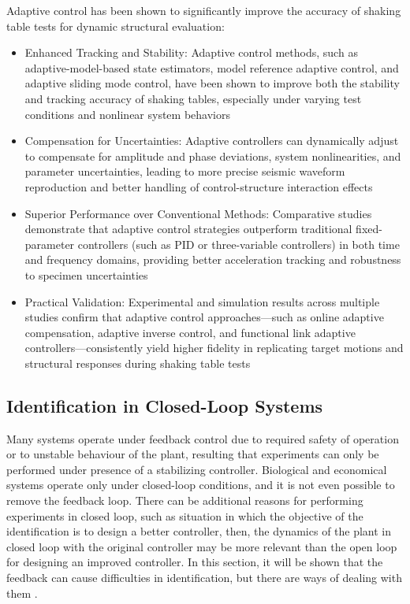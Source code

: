 \documentclass[10pt]{extarticle}
\begin{document}
Adaptive control has been shown to significantly improve the accuracy of shaking table tests for dynamic structural evaluation:
\begin{itemize}
    \item Enhanced Tracking and Stability: Adaptive control methods, such as adaptive-model-based state estimators, model reference adaptive control, and adaptive sliding mode control, have been shown to improve both the stability and tracking accuracy of shaking tables, especially under varying test conditions and nonlinear system behaviors %
    \item Compensation for Uncertainties: Adaptive controllers can dynamically adjust to compensate for amplitude and phase deviations, system nonlinearities, and parameter uncertainties, leading to more precise seismic waveform reproduction and better handling of control-structure interaction effects %
    \item Superior Performance over Conventional Methods: Comparative studies demonstrate that adaptive control strategies outperform traditional fixed-parameter controllers (such as PID or three-variable controllers) in both time and frequency domains, providing better acceleration tracking and robustness to specimen uncertainties %
    \item Practical Validation: Experimental and simulation results across multiple studies confirm that adaptive control approaches—such as online adaptive compensation, adaptive inverse control, and functional link adaptive controllers—consistently yield higher fidelity in replicating target motions and structural responses during shaking table tests %
\end{itemize}

\subsection{Identification in Closed-Loop Systems} \label{Identification in Closed-Loop Systems}

Many systems operate under feedback control due to required safety of operation or to unstable behaviour of the plant, resulting that experiments can only be performed under presence of a stabilizing controller. Biological and economical systems operate only under closed-loop conditions, and it is not even possible to remove the feedback loop. There can be additional reasons for performing experiments in closed loop, such as situation in which the objective of the identification is to design a better controller, then, the dynamics of the plant in closed loop with the original controller may be more relevant than the open loop for designing an improved controller. In this section, it will be shown that the feedback can cause difficulties in identification, but there are ways of dealing with them \citep{VanDenHof2020}.
\end{document}
